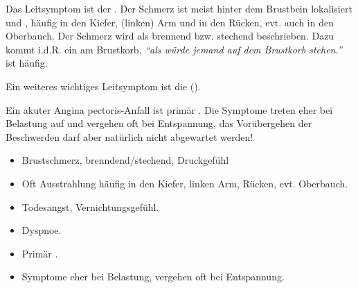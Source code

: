 {
Das Leitsymptom ist der . Der Schmerz ist meist hinter dem Brustbein lokalisiert und
, häufig in den Kiefer, (linken) Arm und in den Rücken,
evt. auch in den Oberbauch. Der Schmerz wird als brennend bzw. stechend beschrieben.
Dazu kommt i.d.R. ein  am Brustkorb, \emph{"`als würde jemand
auf dem Brustkorb stehen."'}  ist
häufig. 

Ein weiteres wichtiges Leitsymptom ist die 
().

Ein akuter Angina pectoris-Anfall ist primär . Die Symptome treten eher bei Belastung auf und
vergehen oft bei Entspannung, das Vorübergehen der Beschwerden darf aber
natürlich nicht abgewartet werden! 

}{
\begin{itemize}
  \item Brustschmerz, brenndend/stechend, Druckgefühl
  \item Oft Ausstrahlung häufig in den Kiefer,
  linken Arm, Rücken, evt. Oberbauch.
  \item Todesangst, Vernichtungsgefühl.
  \item Dyspnoe.
  \item Primär .
  \item Symptome eher bei Belastung, vergehen oft bei Entspannung.
\end{itemize}

}{}{}{}








